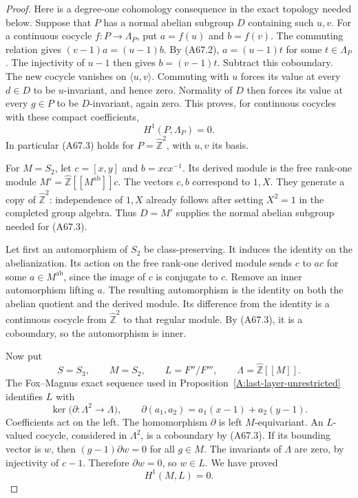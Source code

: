 \documentclass[11pt,oneside]{article}
\begin{document}
\begin{proof}
Here is a degree-one cohomology consequence
in the exact topology needed below.
Suppose that $P$ has a normal abelian subgroup
$D$ containing such $u,v$.
For a continuous cocycle
$f:P\to\Lambda_P$, put $a=f(u)$ and $b=f(v)$.
The commuting relation gives
$(v-1)a=(u-1)b$.
By (A67.2), $a=(u-1)t$ for some
$t\in\Lambda_P$. The injectivity of $u-1$
then gives $b=(v-1)t$.
Subtract this coboundary. The new cocycle
vanishes on $\langle u,v\rangle$.
Commuting with $u$ forces its value at every
$d\in D$ to be $u$-invariant, and hence zero.
Normality of $D$ then forces its value at
every $g\in P$ to be $D$-invariant, again zero.
This proves, for continuous cocycles with
these compact coefficients,
\[
                  H^1(P,\Lambda_P)=0.                 \tag{A67.3}
\]
In particular (A67.3) holds for
$P=\widehat{\mathbb Z}^2$, with $u,v$ its
basis.

For $M=S_2$, let
$c=[x,y]$ and $b=xcx^{-1}$.
Its derived module is the free rank-one
module
$M'=\widehat{\mathbb Z}[[M^{\mathrm{ab}}]]c$.
The vectors $c,b$ correspond to $1,X$.
They generate a copy of
$\widehat{\mathbb Z}^2$: independence of
$1,X$ already follows after setting
$X^2=1$ in the completed group algebra.
Thus $D=M'$ supplies the normal abelian
subgroup needed for (A67.3).

Let first an automorphism of $S_2$ be
class-preserving. It induces the identity on
the abelianization. Its action on the free
rank-one derived module sends $c$ to $a c$
for some $a\in M^{\mathrm{ab}}$, since the
image of $c$ is conjugate to $c$.
Remove an inner automorphism lifting $a$.
The resulting automorphism is the identity
on both the abelian quotient and the derived
module. Its difference from the identity
is a continuous cocycle from
$\widehat{\mathbb Z}^2$ to that regular
module. By (A67.3), it is a coboundary, so
the automorphism is inner.

Now put
\[
 S=S_3,\qquad M=S_2,\qquad
 L=F''/F''',\qquad
 \Lambda=\widehat{\mathbb Z}[[M]].
\]
The Fox--Magnus exact sequence used in
Proposition~\ref{A:last-layer-unrestricted}
identifies $L$ with
\[
 \ker\bigl(\partial:\Lambda^2\to\Lambda\bigr),
 \qquad
       \partial(a_1,a_2)=a_1(x-1)+a_2(y-1).
                                                        \tag{A67.4}
\]
Coefficients act on the left. The homomorphism
$\partial$ is left $M$-equivariant.
An $L$-valued cocycle, considered in
$\Lambda^2$, is a coboundary by (A67.3).
If its bounding vector is $w$, then
$(g-1)\partial w=0$ for all $g\in M$.
The invariants of $\Lambda$ are zero, by
injectivity of $c-1$. Therefore $\partial w=0$,
so $w\in L$. We have proved
\[
                         H^1(M,L)=0.                 \tag{A67.5}
\]


\end{proof}
\end{document}

